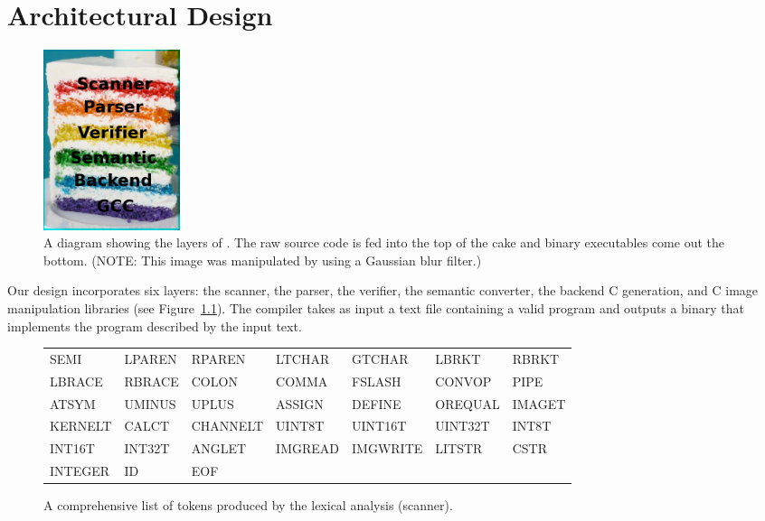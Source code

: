 \chapter{Architectural Design}
\label{chap:archdesign}




\begin{figure}
\begin{center}
\includegraphics[width=40mm]{figures/layers.png}
\caption{A diagram showing the layers of \sys{}. The raw source code is
fed into the top of the cake and binary executables come out the bottom.
(NOTE: This image was manipulated by \sys{} using a Gaussian blur filter.)}
\label{fig:layers}
\end{center}
\end{figure}

Our design incorporates six layers: the scanner, the parser, the verifier,
the semantic converter, the backend C generation, and C image manipulation
libraries (see Figure~\ref{fig:layers}). The compiler takes as input
a text file containing a valid \sys{} program and outputs a binary that
implements the program described by the input text.

\begin{figure}
\begin{center}
\begin{tabular}{l l l l l l l}

    SEMI & LPAREN & RPAREN & LTCHAR & GTCHAR & LBRKT & RBRKT \\
    LBRACE & RBRACE & COLON & COMMA & FSLASH & CONVOP & PIPE \\
    ATSYM & UMINUS & UPLUS & ASSIGN & DEFINE & OREQUAL & IMAGET \\
    KERNELT & CALCT & CHANNELT & UINT8T & UINT16T & UINT32T & INT8T \\
    INT16T & INT32T & ANGLET & IMGREAD & IMGWRITE & LITSTR & CSTR \\
    INTEGER & ID & EOF \\

\end{tabular}
\caption{A comprehensive list of tokens produced by the lexical analysis (scanner).}
\label{fig:tokens}
\end{center}
\end{figure}

